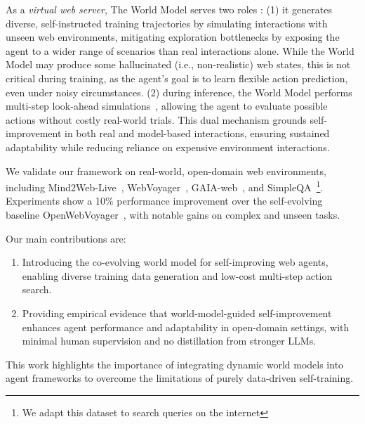 \documentclass[11pt]{article}
\begin{document}
As a \textit{virtual web server}, The World Model serves two roles : (1) it generates diverse, self-instructed training trajectories by simulating interactions with unseen web environments, mitigating exploration bottlenecks by exposing the agent to a wider range of scenarios than real interactions alone. While the World Model may produce some hallucinated (i.e., non-realistic) web states, this is not critical during training, as the agent's goal is to learn flexible action prediction, even under noisy circumstances. 
(2) during inference, the World Model performs multi-step look-ahead simulations~\citep{SLA}, allowing the agent to evaluate possible actions without costly real-world trials. 
This dual mechanism grounds self-improvement in both real and model-based interactions, ensuring sustained adaptability while reducing reliance on expensive environment interactions.


We validate our framework on real-world, open-domain web environments, including Mind2Web-Live~\citep{webcanvas}, WebVoyager~\citep{webvoyager}, GAIA-web~\citep{GAIA}, and SimpleQA~\citep{simpleqa}\footnote{We adapt this dataset to search queries on the internet}. Experiments show a 10\% performance improvement over the self-evolving baseline OpenWebVoyager~\citep{openwebvoyager}, with notable gains on complex and unseen tasks.

Our main contributions are:
\begin{enumerate}
\item Introducing the co-evolving world model for self-improving web agents, enabling diverse training data generation and low-cost multi-step action search.
\item Providing empirical evidence that world-model-guided self-improvement enhances agent performance and adaptability in open-domain settings, with minimal human supervision and no distillation from stronger LLMs.
\end{enumerate}

This work highlights the importance of integrating dynamic world models into agent frameworks to overcome the limitations of purely data-driven self-training.
\end{document}
